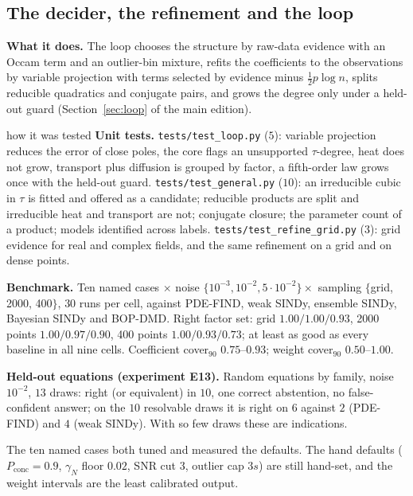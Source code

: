 \subsection{The decider, the refinement and the loop}\label{sec:decider}
\textbf{What it does.} The loop chooses the structure by raw-data evidence with an Occam term and an outlier-bin mixture, refits the coefficients to the observations by variable projection with terms selected by evidence minus $\tfrac12p\log n$, splits reducible quadratics and conjugate pairs, and grows the degree only under a held-out guard (Section~\ref{sec:loop} of the main edition).

\begin{explained}{how it was tested}
\textbf{Unit tests.} \texttt{tests/test\_loop.py} ($5$): variable projection reduces the error of close poles, the core flags an unsupported $\tau$-degree, heat does not grow, transport plus diffusion is grouped by factor, a fifth-order law grows once with the held-out guard. \texttt{tests/test\_general.py} ($10$): an irreducible cubic in $\tau$ is fitted and offered as a candidate; reducible products are split and irreducible heat and transport are not; conjugate closure; the parameter count of a product; models identified across labels. \texttt{tests/test\_refine\_grid.py} ($3$): grid evidence for real and complex fields, and the same refinement on a grid and on dense points.

\medskip\textbf{Benchmark.} Ten named cases $\times$ noise $\{10^{-3},10^{-2},5\cdot10^{-2}\}\times$ sampling $\{$grid, 2000, 400$\}$, $30$ runs per cell, against PDE-FIND, weak SINDy, ensemble SINDy, Bayesian SINDy and BOP-DMD. Right factor set: grid $1.00/1.00/0.93$, 2000 points $1.00/0.97/0.90$, 400 points $1.00/0.93/0.73$; at least as good as every baseline in all nine cells. Coefficient cover$_{90}$ $0.75$--$0.93$; weight cover$_{90}$ $0.50$--$1.00$.

\medskip\textbf{Held-out equations (experiment E13).} Random equations by family, noise $10^{-2}$, $13$ draws: right (or equivalent) in $10$, one correct abstention, no false-confident answer; on the $10$ resolvable draws it is right on $6$ against $2$ (PDE-FIND) and $4$ (weak SINDy). With so few draws these are indications.
\end{explained}

\begin{caution}[title=What this part does not show]
The ten named cases both tuned and measured the defaults. The hand defaults ($P_{\mathrm{conc}}=0.9$, $\gamma_N$ floor $0.02$, SNR cut $3$, outlier cap $3s$) are still hand-set, and the weight intervals are the least calibrated output.
\end{caution}

